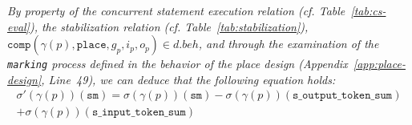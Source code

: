 \textit{By property of the \hvhdl{} concurrent statement execution
  relation (cf. Table~\ref{tab:cs-eval}), the stabilization relation
  (cf. Table~\ref{tab:stabilization}),
  $\mathtt{comp}(\gamma(p),\mathtt{place},g_p,i_p,o_p)\in{}d.beh$, and
  through the examination of the \texttt{marking} process defined in
  the behavior of the place design (Appendix~\ref{app:place-design},
  Line~49), we can deduce that the following equation holds:}
\begin{equation*}
  \begin{split}
    \sigma'(\gamma(p))(\texttt{sm})=\sigma(\gamma(p))(\texttt{sm})-\sigma(\gamma(p))(\texttt{s\_output\_token\_sum})\\
    +\sigma(\gamma(p))(\texttt{s\_input\_token\_sum})
  \end{split}
\end{equation*}







